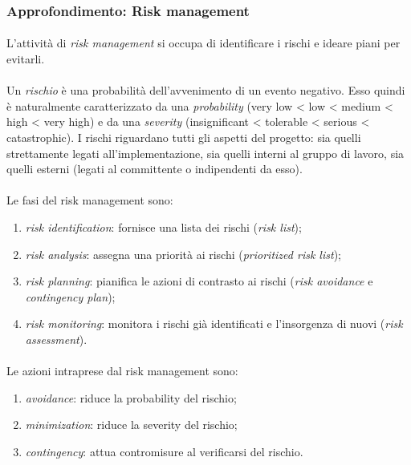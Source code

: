\documentclass[11pt,a4paper,english]{article}
\begin{document}
\subsubsection{Approfondimento: Risk management}

\paragraph{} L'attività di \emph{risk management} \cite{risk_management} si occupa di identificare i rischi e ideare piani per evitarli.

\paragraph{} Un \emph{rischio} è una probabilità dell'avvenimento di un evento negativo. Esso quindi è naturalmente caratterizzato da una \emph{probability} (very low < low < medium < high < very high) e da una \emph{severity} (insignificant < tolerable < serious < catastrophic). I rischi riguardano tutti gli aspetti del progetto: sia quelli strettamente legati all'implementazione, sia quelli interni al gruppo di lavoro, sia quelli esterni (legati al committente o indipendenti da esso). 

\paragraph{} Le fasi del risk management sono:
\begin{enumerate}
    \item \emph{risk identification}: fornisce una lista dei rischi (\emph{risk list});
    \item \emph{risk analysis}: assegna una priorità ai rischi (\emph{prioritized risk list});
    \item \emph{risk planning}: pianifica le azioni di contrasto ai rischi (\emph{risk avoidance} e \emph{contingency plan});
    \item \emph{risk monitoring}: monitora i rischi già identificati e l'insorgenza di nuovi (\emph{risk assessment}).
\end{enumerate}

\paragraph{} Le azioni intraprese dal risk management sono:
\begin{enumerate}
    \item \emph{avoidance}: riduce la probability del rischio;
    \item \emph{minimization}: riduce la severity del rischio;
    \item \emph{contingency}: attua contromisure al verificarsi del rischio.
\end{enumerate}
\end{document}
